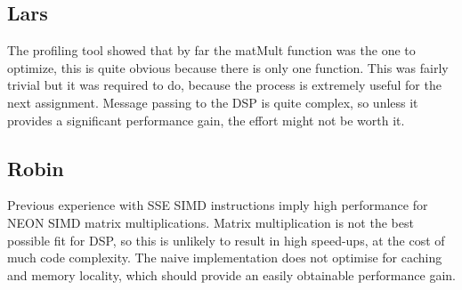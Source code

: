 \documentclass[final]{article} %
\begin{document}
\begin{appendices}
\subsection{Lars}
The profiling tool showed that by far the matMult function was the one to optimize, this is quite obvious because there is only one function.
This was fairly trivial but it was required to do, because the process is extremely useful for the next assignment. Message passing to the DSP is quite complex, so unless it provides a significant performance gain, the effort might not be worth it.

\subsection{Robin}
Previous experience with SSE SIMD instructions imply high performance for NEON SIMD matrix multiplications. Matrix multiplication is not the best possible fit for DSP, so this is unlikely to result in high speed-ups, at the cost of much code complexity. The naive implementation does not optimise for caching and memory locality, which should provide an easily obtainable performance gain.

\end{appendices}
\end{document}
